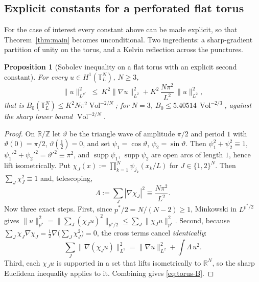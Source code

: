 \documentclass[11pt,reqno]{amsart}
\theoremstyle{plain}
\newtheorem{proposition}[theorem]{Proposition}
\theoremstyle{definition}
\newcommand{\R}{\mathbb{R}}
\newcommand{\Tor}{\mathbb{T}}
\newcommand{\pstar}{p^{*}}
\newcommand{\Vol}{\operatorname{Vol}}
\newcommand{\Ksob}{K}
\begin{document}
\subsection{Explicit constants for a perforated flat torus}
\label{sec:explicit}

For the case of interest every constant above can be made explicit, so that
Theorem~\ref{thm:main} becomes unconditional. Two ingredients: a sharp-gradient
partition of unity on the torus, and a Kelvin reflection across the punctures.

\begin{proposition}[Sobolev inequality on a flat torus with an explicit second constant]
\label{prop:torus-B}
For every $u\in H^1(\Tor^N_L)$, $N\ge3$,
\begin{equation}
\label{eq:torus-B}
  \|u\|^2_{L^{\pstar}}\ \le\ \Ksob^2\|\nabla u\|^2_{L^2}
        +\Ksob^2\,\frac{N\pi^2}{L^2}\,\|u\|^2_{L^2},
\end{equation}
that is $B_0(\Tor^N_L)\le\Ksob^2N\pi^2\Vol^{-2/N}$; for $N=3$,
$B_0\le5.40514\,\Vol^{-2/3}$, against the sharp lower bound $\Vol^{-2/N}$.
\end{proposition}

\begin{proof}
On $\R/\mathbb{Z}$ let $\vartheta$ be the triangle wave of amplitude $\pi/2$ and
period $1$ with $\vartheta(0)=\pi/2$, $\vartheta(\tfrac12)=0$, and set
$\psi_1=\cos\vartheta$, $\psi_2=\sin\vartheta$. Then $\psi_1^2+\psi_2^2\equiv1$,
$\psi_1'^2+\psi_2'^2=\vartheta'^2\equiv\pi^2$, and $\operatorname{supp}\psi_1$,
$\operatorname{supp}\psi_2$ are open arcs of length $1$, hence lift isometrically.
Put $\chi_J(x):=\prod_{k=1}^N\psi_{j_k}(x_k/L)$ for $J\in\{1,2\}^N$. Then
$\sum_J\chi_J^2\equiv1$ and, telescoping,
\begin{equation}
\label{eq:Lambda}
  \Lambda:=\sum_J|\nabla\chi_J|^2\equiv\frac{N\pi^2}{L^2}.
\end{equation}
Now three exact steps. First, since $\pstar/2=N/(N-2)\ge1$, Minkowski in
$L^{\pstar/2}$ gives
$\|u\|^2_{\pstar}=\bigl\|\sum_J(\chi_Ju)^2\bigr\|_{\pstar/2}
 \le\sum_J\|\chi_Ju\|^2_{\pstar}$.
Second, because $\sum_J\chi_J\nabla\chi_J=\tfrac12\nabla\bigl(\sum_J\chi_J^2\bigr)=0$,
the cross terms cancel \emph{identically}:
\begin{equation}
\label{eq:nocross}
  \sum_J\|\nabla(\chi_Ju)\|^2_{L^2}=\|\nabla u\|^2_{L^2}+\int\Lambda\,u^2 .
\end{equation}
Third, each $\chi_Ju$ is supported in a set that lifts isometrically to $\R^N$, so
the sharp Euclidean inequality applies to it. Combining gives \eqref{eq:torus-B}.
\end{proof}
\end{document}

